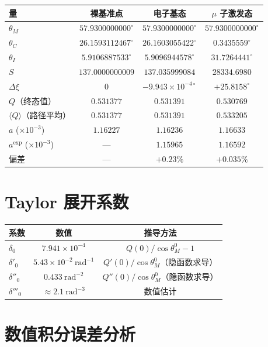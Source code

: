 \documentclass[12pt,a4paper]{article}
\theoremstyle{definition}
\begin{document}
\begin{center}
\begin{tabular}{@{}lccc@{}}
\toprule
量 & 裸基准点 & 电子基态 & $\mu$ 子激发态 \\
\midrule
$\theta_M$ & $57.9300000000^\circ$ & $57.9300000000^\circ$ & $57.9300000000^\circ$ \\
$\theta_C$ & $26.1593112467^\circ$ & $26.1603055422^\circ$ & $0.3435559^\circ$ \\
$\theta_I$ & $5.9106887533^\circ$ & $5.9096944578^\circ$ & $31.7264441^\circ$ \\
$S$ & $137.0000000009$ & $137.035999084$ & $28334.6980$ \\
$\Delta\xi$ & $0$ & $-9.943\times10^{-4\circ}$ & $+25.8158^\circ$ \\
$Q$（终态值） & $0.531377$ & $0.531391$ & $0.530769$ \\
$\langle Q\rangle$（路径平均） & $0.531377$ & $0.531391$ & $0.533205$ \\
$a$ ($\times10^{-3}$) & $1.16227$ & $1.16236$ & $1.16633$ \\
$a^{\text{exp}}$ ($\times10^{-3}$) & --- & $1.15965$ & $1.16592$ \\
偏差 & --- & $+0.23\%$ & $+0.035\%$ \\
\bottomrule
\end{tabular}
\end{center}

\section{Taylor 展开系数}

\begin{center}
\begin{tabular}{@{}lcc@{}}
\toprule
系数 & 数值 & 推导方法 \\
\midrule
$\delta_0$ & $7.941\times10^{-4}$ & $Q(0)/\cos\theta_M^0-1$ \\
$\delta'_0$ & $5.43\times10^{-2}~\mathrm{rad}^{-1}$ & $Q'(0)/\cos\theta_M^0$（隐函数求导） \\
$\delta''_0$ & $0.433~\mathrm{rad}^{-2}$ & $Q''(0)/\cos\theta_M^0$（隐函数求导） \\
$\delta'''_0$ & $\approx2.1~\mathrm{rad}^{-3}$ & 数值估计 \\
\bottomrule
\end{tabular}
\end{center}

\section{数值积分误差分析}
\end{document}
